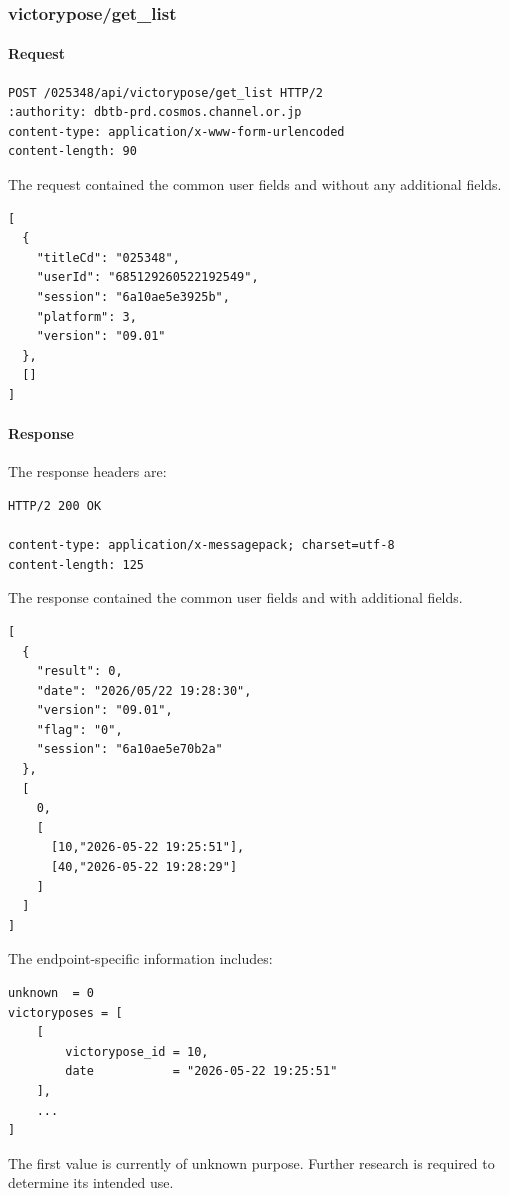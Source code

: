 \subsubsection{victorypose/get\_list}
\label{subsec:api_victorypose_get_list}

\paragraph{Request}

\begin{lstlisting}
POST /025348/api/victorypose/get_list HTTP/2
:authority: dbtb-prd.cosmos.channel.or.jp
content-type: application/x-www-form-urlencoded
content-length: 90
\end{lstlisting}

The request contained the common user fields and without any additional fields.

\begin{lstlisting}
[
  {
    "titleCd": "025348",
    "userId": "685129260522192549",
    "session": "6a10ae5e3925b",
    "platform": 3,
    "version": "09.01"
  },
  []
]
\end{lstlisting}

\newpage

\paragraph{Response}

The response headers are:

\begin{lstlisting}
HTTP/2 200 OK

content-type: application/x-messagepack; charset=utf-8
content-length: 125
\end{lstlisting}

The response contained the common user fields and with additional fields.

\begin{lstlisting}
[
  {
    "result": 0,
    "date": "2026/05/22 19:28:30",
    "version": "09.01",
    "flag": "0",
    "session": "6a10ae5e70b2a"
  },
  [
    0,
    [
      [10,"2026-05-22 19:25:51"],
      [40,"2026-05-22 19:28:29"]
    ]
  ]
]
\end{lstlisting}

The endpoint-specific information includes:

\begin{lstlisting}
unknown  = 0
victoryposes = [
    [
        victorypose_id = 10,
        date           = "2026-05-22 19:25:51"
    ],
    ...
]
\end{lstlisting}

\begin{tcolorbox}[colback=yellow!10,colframe=orange!80!black,title=Warning]
The first value is currently of unknown purpose.
Further research is required to determine its intended use.
\end{tcolorbox}

\newpage